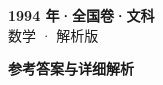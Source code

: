 \documentclass[zihao=-4, a4paper]{ctexart}
\begin{document}
\begin{center}
  {\Large\bfseries 1994 年·全国卷·文科}\\[4pt]
  {\large 数学 · 解析版}
\end{center}
\medskip
{}

\clearpage
{}
\begin{center}{\Large\bfseries 参考答案与详细解析}\end{center}
\medskip

\end{document}
